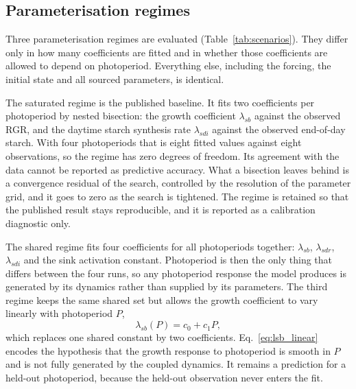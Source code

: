 
\subsection{Parameterisation regimes}

Three parameterisation regimes are evaluated (Table~\ref{tab:scenarios}). They
differ only in how many coefficients are fitted and in whether those
coefficients are allowed to depend on photoperiod. Everything else, including
the forcing, the initial state and all sourced parameters, is identical.

The saturated regime is the published baseline. It fits two coefficients per
photoperiod by nested bisection: the growth coefficient $\lambda_{sb}$ against
the observed RGR, and the daytime starch synthesis rate $\lambda_{sdi}$ against
the observed end-of-day starch. With four photoperiods that is eight fitted
values against eight observations, so the regime has zero degrees of freedom.
Its agreement with the data cannot be reported as predictive accuracy. What a
bisection leaves behind is a convergence residual of the search, controlled by
the resolution of the parameter grid, and it goes to zero as the search is
tightened. The regime is retained so that the published result stays
reproducible, and it is reported as a calibration diagnostic only.

The shared regime fits four coefficients for all photoperiods together:
$\lambda_{sb}$, $\lambda_{sdr}$, $\lambda_{sdi}$ and the sink activation
constant. Photoperiod is then the only thing that differs between the four
runs, so any photoperiod response the model produces is generated by its
dynamics rather than supplied by its parameters. The third regime keeps the
same shared set but allows the growth coefficient to vary linearly with
photoperiod $P$,
\begin{equation}
\lambda_{sb}(P) = c_0 + c_1 P ,
\label{eq:lsb_linear}
\end{equation}
which replaces one shared constant by two coefficients. Eq.~\eqref{eq:lsb_linear}
encodes the hypothesis that the growth response to photoperiod is smooth in $P$
and is not fully generated by the coupled dynamics. It remains a prediction for
a held-out photoperiod, because the held-out observation never enters the fit.

